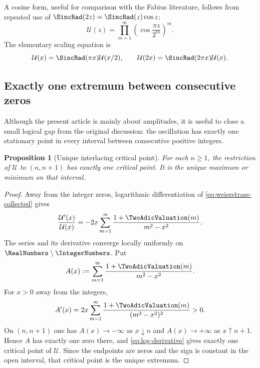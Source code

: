 \documentclass[11pt,oneside]{article}
\newtheorem{proposition}[theorem]{Proposition}
\theoremstyle{definition}
\theoremstyle{remark}
\newcommand{\Uhat}{\mathcal U}
\begin{document}
A cosine form, useful for comparison with the Fabius literature, follows from repeated
use of $\SincRad(2z)=\SincRad(z)\cos z$:
\begin{equation}\label{eq:cosine-form}
 \Uhat(z)=\prod_{m=1}^{\infty}
 \left(\cos\frac{\pi z}{2^m}\right)^m.
\end{equation}
The elementary scaling equation is
\begin{equation}\label{eq:scaling}
 \Uhat(x)=\SincRad(\pi x)\Uhat(x/2),
 \qquad
 \Uhat(2x)=\SincRad(2\pi x)\Uhat(x).
\end{equation}

\subsection{Exactly one extremum between consecutive zeros}

Although the present article is mainly about amplitudes, it is useful to close a small
logical gap from the original discussion: the oscillation has exactly one stationary
point in every interval between consecutive positive integers.

\begin{proposition}[Unique interlacing critical point]\label{prop:critical}
For each $n\ge1$, the restriction of $\Uhat$ to $(n,n+1)$ has exactly one critical
point.  It is the unique maximum or minimum on that interval.
\end{proposition}

\begin{proof}
Away from the integer zeros, logarithmic differentiation of
\eqref{eq:weierstrass-collected} gives
\begin{equation}\label{eq:log-derivative}
 \frac{\Uhat'(x)}{\Uhat(x)}
 =-2x\sum_{m=1}^{\infty}
 \frac{1+\TwoAdicValuation(m)}{m^2-x^2}.
\end{equation}
The series and its derivative converge locally uniformly on
$\RealNumbers\setminus\IntegerNumbers$.  Put
\[
 A(x):=\sum_{m=1}^{\infty}\frac{1+\TwoAdicValuation(m)}{m^2-x^2}.
\]
For $x>0$ away from the integers,
\[
 A'(x)=2x\sum_{m=1}^{\infty}
 \frac{1+\TwoAdicValuation(m)}{(m^2-x^2)^2}>0.
\]
On $(n,n+1)$ one has $A(x)\to-\infty$ as $x\downarrow n$ and
$A(x)\to+\infty$ as $x\uparrow n+1$.  Hence $A$ has exactly one zero there, and
\eqref{eq:log-derivative} gives exactly one critical point of $\Uhat$.  Since the
endpoints are zeros and the sign is constant in the open interval, that critical point
is the unique extremum.
\end{proof}
\end{document}
